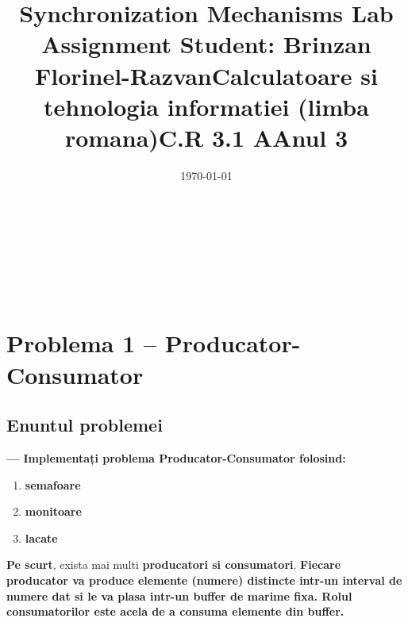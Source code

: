 \documentclass[14pt]{article}
\begin{document}
\title{\huge \textbf{Synchronization Mechanisms Lab Assignment} }
\date{\today}
\maketitle
\begin{center}
\vspace{30 mm}

\title{\huge \textbf{Student: Brinzan Florinel-Razvan}}
\\\vspace{10 mm}
\title{\huge Calculatoare si tehnologia informatiei (limba romana)}
\\\vspace{10 mm}
\title{\huge \textbf{C.R 3.1 A}}
\\\vspace{10 mm}
\title{\huge \textbf{Anul 3}}
\date{}
\maketitle

\newpage
\end{center}

\section{Problema 1 -- Producator-Consumator}

\vspace{4 mm}

\subsection{Enuntul problemei}

\vspace{2 mm}


\textbf{--- Implementați problema Producator-Consumator folosind:}

\begin{enumerate}
\item \textbf{semafoare}
\item \textbf{monitoare }
\item \textbf{lacate}
\end{enumerate}

\textbf{Pe scurt}, exista mai multi\textbf{ producatori si consumatori}. \textbf{Fiecare producator va produce elemente (numere) distincte intr-un interval de numere dat si le va plasa intr-un buffer de marime fixa. Rolul consumatorilor este acela de a consuma elemente din buffer. }
\end{document}

